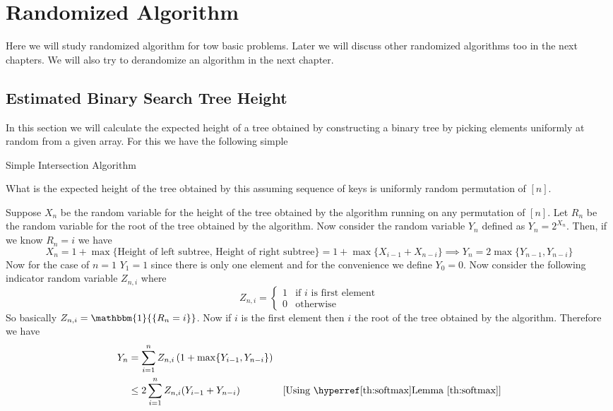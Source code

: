 \chapter{Randomized Algorithm}
Here we will study randomized algorithm for tow basic problems. Later we will discuss other randomized algorithms too in the next chapters. We will also try to derandomize an algorithm in the next chapter.
\section{Estimated Binary Search Tree Height}
In this section we will calculate the expected height of a tree obtained by constructing a binary tree by picking elements uniformly at random from a given array. For this we have the following simple 

\begin{algorithm}
\DontPrintSemicolon{}
\caption{Simple Intersection Algorithm}
\end{algorithm}

\begin{question}{}{}
	What is the expected height of the tree obtained by this  assuming sequence of keys is uniformly random permutation of $[n]$.
\end{question}

Suppose $X_n$ be the random variable for the height of the tree obtained by the algorithm running on any permutation of $[n]$. Let $R_n$ be the random variable for the root of the tree obtained by the algorithm. Now consider the random variable $Y_n$ defined as $Y_n=2^{X_n}$. Then, if we know $R_n=i$ we have  $$X_n=1+\max\{\text{Height of left subtree, Height of right subtree}\}=1+\max\{X_{i-1}+X_{n-i}\}\implies Y_n=2\max\{Y_{n-1},Y_{n-i}\}$$Now for the case of $n=1$ $Y_1=1$  since there is only one element and for the convenience we define $Y_0=0$. Now consider the following indicator random variable $Z_{n,i}$ where $$Z_{n,i}=\begin{cases}
	1 & \text{if $i$ is first element}\\ 0 & \text{otherwise}
\end{cases}$$So basically $Z_{n,i}=\mathbbm{1}{\{R_n=i\}}$. Now if $i$ is the first element then $i$ the root of the tree obtained by the algorithm. Therefore we have \begin{align*}
Y_n &=\sum\limits_{i=1}^n Z_{n,i}\lt(1+\max\{Y_{i-1},Y_{n-i}\}\rt)\\
& \leq 2\sum\limits_{i=1}^nZ_{n,i}(Y_{i-1}+Y_{n-i}) & [\text{Using \lmref{softmax}}]
\end{align*}

